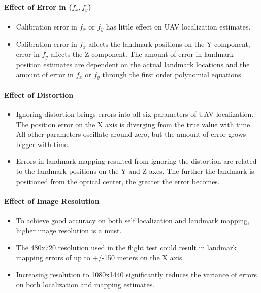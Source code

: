 \paragraph{Effect of Error in ($f_x, f_y$)}
\begin{itemize}
  \item Calibration error in $f_x$ or $f_y$ has little effect on UAV
  localization estimates.
  \item Calibration error in $f_x$ affects the landmark positions on the
  Y component, error in $f_y$ affects the Z component. The amount of
  error in landmark position estimates are dependent on the actual
  landmark locations and the amount of error in $f_x$
  or $f_y$ through the first order polynomial equations.
\end{itemize}

\paragraph{Effect of Distortion}
\begin{itemize}
  \item Ignoring distortion brings errors into all six parameters of
  UAV localization. The position error on the X axis is diverging
  from the true value with time. All other parameters oscillate around
  zero, but the amount of error grows bigger with time.
  \item Errors in landmark mapping resulted from ignoring the
  distortion are related to the landmark positions on the Y and Z
  axes. The further the landmark is positioned from the optical
  center, the greater the error becomes.
\end{itemize}

\paragraph{Effect of Image Resolution}
\begin{itemize}
  \item To achieve good accuracy on both self localization and landmark
  mapping, higher image resolution is a must.
  \item The 480x720 resolution used in the flight test could result in
  landmark mapping errors of up to +/-150 meters on the X axis.
  \item Increasing resolution to 1080x1440 significantly reduces the
  variance of errors on both localization and mapping estimates.
\end{itemize}

